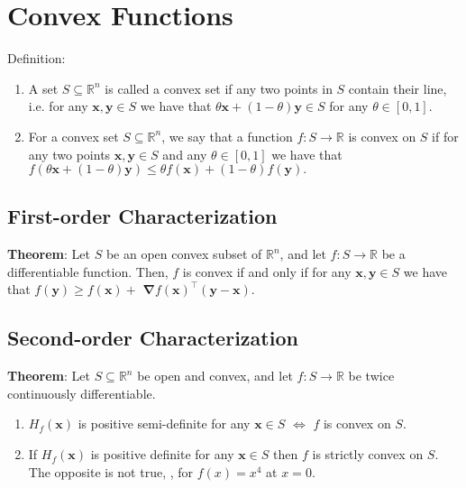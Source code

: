 \section{Convex Functions}

Definition:
\begin{enumerate}
    \item  A set $S \subseteq \mathbb{R}^{n}$ is called a convex set if any two points in $S$ contain their line, i.e. for any $\boldsymbol{x}, \boldsymbol{y} \in S$ we have that $\theta \boldsymbol{x}+(1-\theta) \boldsymbol{y} \in S$ for any $\theta \in[0,1]$.
    \item For a convex set $S \subseteq \mathbb{R}^{n}$, we say that a function $f: S \rightarrow \mathbb{R}$ is convex on $S$ if for any two points $\boldsymbol{x}, \boldsymbol{y} \in S$ and any $\theta \in[0,1]$ we have that
    $
    f(\theta \boldsymbol{x}+(1-\theta) \boldsymbol{y}) \leq \theta f(\boldsymbol{x})+(1-\theta) f(\boldsymbol{y}).
    $
\end{enumerate}


\subsection{First-order Characterization}
\textbf{Theorem}:
Let $S$ be an open convex subset of $\mathbb{R}^{n}$, and let $f: S \rightarrow \mathbb{R}$ be a differentiable function. Then, $f$ is convex if and only if for any $\boldsymbol{x}, \boldsymbol{y} \in S$ we have that $f(\boldsymbol{y}) \geq f(\boldsymbol{x})+$ $\boldsymbol{\nabla} f(\boldsymbol{x})^{\top}(\boldsymbol{y}-\boldsymbol{x}) .$

\subsection{Second-order Characterization}
\textbf{Theorem}:
Let $S \subseteq \mathbb{R}^{n}$ be open and convex, and let $f: S \rightarrow \mathbb{R}$ be twice continuously differentiable.
\begin{enumerate}
    \item $H_{f}(\boldsymbol{x})$ is positive semi-definite for any $\boldsymbol{x} \in S$ $\Leftrightarrow$ $f$ is convex on $S$.
    \item If $H_{f}(\boldsymbol{x})$ is positive definite for any $\boldsymbol{x} \in S$ then $f$ is strictly convex on $S$. The opposite is not true, \eg, for $f(x)=x^4$ at $x=0$.
\end{enumerate}

